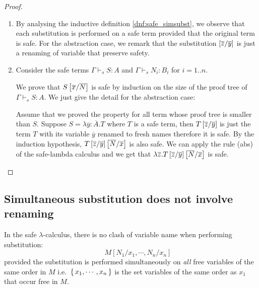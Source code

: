 \begin{proof}
\begin{enumerate}
\item By analysing the inductive definition \ref{dnf:safe_simsubst}, we
observe that each substitution is performed on a safe term provided
that the original term is safe. For the abstraction case, we remark
that the substitution $\left[ \overline{z}/\overline{y} \right]$ is just a
renaming of variable that preserve safety.

\item Consider the safe terms $\Gamma \vdash_s S : A$ and  $\Gamma \vdash_s N_i : B_i$ for $i = 1..n$.

We prove that $S \left[ \overline{x}/\overline{N} \right]$ is safe by
induction on the size of the proof tree of $\Gamma \vdash_s S : A$.
We just give the detail for the abstraction case:

Assume that we proved the property for all term whose proof tree is
smaller than $S$. Suppose $S = \lambda \overline{y} : \overline{A}.
T$ where $T$ is a safe term, then $T
\left[ \overline{z}/\overline{y} \right]$ is just the term $T$ with its
variable $\overline{y}$ renamed to fresh names therefore it is safe.
By the induction hypothesis,
$T\left[ \overline{z}/\overline{y} \right]\left[ \overline{N}/\overline{x} \right]$
is also safe. We can apply the rule (abs) of the safe-lambda
calculus and we get that $\lambda \overline{z} . T
\left[ \overline{z}/\overline{y} \right]
\left[ \overline{N}/\overline{x} \right]$ is safe.
\end{enumerate}
\end{proof}


\subsection{Simultaneous substitution does not involve renaming}



\begin{lem}
In the safe $\lambda$-calculus, there is no clash of variable name
when performing substitution:
\[ \qquad M[N_1 / x_1 , \cdots, N_n / x_n] \]
 provided the substitution is performed simultaneously on
\emph{all} free variables of the same order in $M$
i.e.~$\{\,{x_1, \cdots, x_n}\,\}$ is the set variables of the same
order as $x_1$ that occur free in $M$.
\end{lem}

